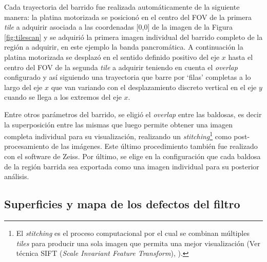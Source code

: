 Cada trayectoria del barrido fue realizada automáticamente de la siguiente manera: la platina motorizada se posicionó en el centro del FOV de la primera \textit{tile} a adquirir asociada a las coordenadas [0,0] de la imagen de la Figura \ref{fig:tilescan} y se adquirió la primera imagen individual del barrido completo de la región a adquirir, en este ejemplo la banda pancromática. A continuación la platina motorizada se desplazó en el sentido definido positivo del eje $x$ hasta el centro del FOV de la segunda \textit{tile} a adquirir teniendo en cuenta el \textit{overlap} configurado y así siguiendo una trayectoria que barre por `filas' completas a lo largo del eje $\textit{x}$ que van variando con el desplazamiento discreto vertical en el eje $\textit{y}$ cuando se llega a los extremos del eje $\textit{x}$.

Entre otros parámetros del barrido, se eligió el \textit{overlap} entre las baldosas, es decir la superposición entre las mismas que luego permite obtener una imagen completa individual para su visualización,  realizando un \textit{stitching}\footnote{El \textit{stitching} es el proceso computacional por el cual se combinan múltiples \textit{tiles} para
producir una sola imagen que permita una mejor visualización (Ver técnica SIFT (\textit{Scale Invariant Feature Transform}), \cite{Lowe}).} como post-procesamiento de las imágenes. Este último procedimiento también fue realizado con el software de Zeiss. Por último, se elige en la configuración que cada baldosa de la región barrida sea exportada como una imagen individual para su posterior análisis.

\singlespacing
\subsection{Superficies y mapa de los defectos del filtro}
\label{subs:compl}

